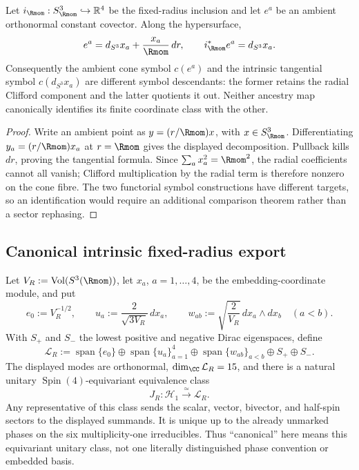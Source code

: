 \documentclass[11pt]{article}
\begin{document}
\begin{proposition}
\label{p1:prop:cone-tangential-symbol-split}
Let \(i_{\Rmom}:S^3_{\Rmom}\hookrightarrow\mathbb R^4\) be the fixed-radius
inclusion and let \(e^a\) be an ambient orthonormal constant covector.  Along
the hypersurface,
\[
 e^a=d_{S^3}x_a+\frac{x_a}{\Rmom}\,dr,
 \qquad i_{\Rmom}^*e^a=d_{S^3}x_a.
\]
Consequently the ambient cone symbol \(c(e^a)\) and the intrinsic tangential
symbol \(c(d_{S^3}x_a)\) are different symbol descendants: the former retains
the radial Clifford component and the latter quotients it out.  Neither
ancestry map canonically identifies its finite coordinate class with the
other.
\end{proposition}

\begin{proof}
Write an ambient point as \(y=(r/\Rmom)x\), with
\(x\in S^3_{\Rmom}\).  Differentiating
\(y_a=(r/\Rmom)x_a\) at \(r=\Rmom\) gives the displayed decomposition.
Pullback kills \(dr\), proving the tangential formula.  Since
\(\sum_a x_a^2=\Rmom^2\), the radial coefficients cannot all vanish; Clifford
multiplication by the radial term is therefore nonzero on the cone fibre.
The two functorial symbol constructions have different targets, so an
identification would require an additional comparison theorem rather than a
sector rephasing.
\end{proof}

\subsection{Canonical intrinsic fixed-radius export}

\begin{theorem}
\label{p1:thm:canonical-retained-smooth-model}
\leavevmode\par
Let \(V_R:=\operatorname{Vol}(S^3(\Rmom))\), let
\(x_a\), \(a=1,\ldots,4\), be the embedding-coordinate module, and put
\[
 e_0:=V_R^{-1/2},\qquad
 u_a:=\frac{2}{\sqrt{3V_R}}\,dx_a,\qquad
 w_{ab}:=\sqrt{\frac{2}{V_R}}\,dx_a\wedge dx_b
 \quad(a<b).
\]
With \(S_+\) and \(S_-\) the lowest positive and negative Dirac eigenspaces,
define
\[
 \mathcal L_R
 :=\operatorname{span}\{e_0\}
 \oplus\operatorname{span}\{u_a\}_{a=1}^4
 \oplus\operatorname{span}\{w_{ab}\}_{a<b}
 \oplus S_+\oplus S_-.
\]
The displayed modes are orthonormal, \(\dim_{\CC}\mathcal L_R=15\), and
there is a natural unitary \(\operatorname{Spin}(4)\)-equivariant equivalence class
\[
 J_R:\mathcal H_1\xrightarrow{\ \simeq\ }\mathcal L_R.
\]
Any representative of this class sends the scalar, vector, bivector, and
half-spin sectors to the displayed summands.  It is unique up to the already
unmarked phases on the six multiplicity-one irreducibles.  Thus
``canonical'' here means this equivariant unitary class, not one literally
distinguished phase convention or embedded basis.
\end{theorem}
\end{document}
